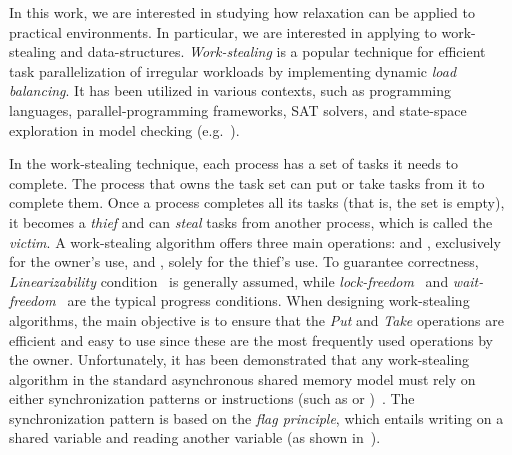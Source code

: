 In this work, we are interested in studying how relaxation can be applied to practical environments. In particular, we are interested in applying to work-stealing and data-structures. \emph{Work-stealing} is a popular technique for efficient task parallelization of irregular workloads by implementing dynamic \emph{load balancing}. It has been utilized in various contexts, such as programming languages, parallel-programming frameworks, SAT solvers, and state-space exploration in model checking (e.g.~\cite{DBLP_journals_tpds_AyguadeCDHLMTUZ09,
  DBLP_journals_jpdc_BlumofeJKLRZ96, DBLP_journals_tpds_AyguadeCDHLMTUZ09, DBLP_conf_jvm_FloodDSZ01, DBLP_conf_pldi_FrigoLR98, DBLP_conf_java_Lea00, DBLP_conf_hpca_RangerRPBK07}).

In the work-stealing technique, each process has a set of tasks it needs to complete. The process that owns the task set can put or take tasks from it to complete them. Once a process completes all its tasks (that is, the set is empty), it becomes a \emph{thief} and can \emph{steal} tasks from another process, which is called the \emph{victim}. A work-stealing algorithm offers three main operations: \Put{} and \Take, exclusively for the owner's use, and \Steal, solely for the thief's use. To guarantee correctness, \emph{Linearizability} condition~\cite{DBLP_journals_toplas_HerlihyW90}  is generally assumed, while \emph{lock-freedom}~\cite{DBLP_journals_toplas_HerlihyW90}  and \emph{wait-freedom}~\cite{DBLP_journals_toplas_Herlihy91} are the typical progress conditions. When designing work-stealing algorithms, the main objective is to ensure that the \emph{Put} and \emph{Take} operations are efficient and easy to use since these are the most frequently used operations by the owner. Unfortunately, it has been demonstrated that any work-stealing algorithm in the standard asynchronous shared memory model must rely on either \RAW{} synchronization patterns or \emph{\RMW} instructions (such as \CAS{} or \TAS)~\cite{DBLP_conf_popl_AttiyaGHKMV11}. The \RAW{} synchronization pattern is based on the \emph{flag principle}, which entails writing on a shared variable and reading another variable (as shown in~\cite{DBLP_books_daglib_0020056}).


